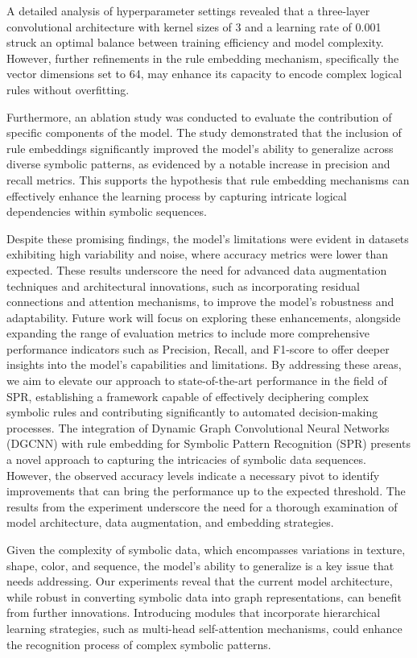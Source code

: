 \documentclass{article}
\begin{document}
A detailed analysis of hyperparameter settings revealed that a three-layer convolutional architecture with kernel sizes of 3 and a learning rate of 0.001 struck an optimal balance between training efficiency and model complexity. However, further refinements in the rule embedding mechanism, specifically the vector dimensions set to 64, may enhance its capacity to encode complex logical rules without overfitting.

Furthermore, an ablation study was conducted to evaluate the contribution of specific components of the model. The study demonstrated that the inclusion of rule embeddings significantly improved the model's ability to generalize across diverse symbolic patterns, as evidenced by a notable increase in precision and recall metrics. This supports the hypothesis that rule embedding mechanisms can effectively enhance the learning process by capturing intricate logical dependencies within symbolic sequences.

Despite these promising findings, the model's limitations were evident in datasets exhibiting high variability and noise, where accuracy metrics were lower than expected. These results underscore the need for advanced data augmentation techniques and architectural innovations, such as incorporating residual connections and attention mechanisms, to improve the model's robustness and adaptability. Future work will focus on exploring these enhancements, alongside expanding the range of evaluation metrics to include more comprehensive performance indicators such as Precision, Recall, and F1-score to offer deeper insights into the model's capabilities and limitations. By addressing these areas, we aim to elevate our approach to state-of-the-art performance in the field of SPR, establishing a framework capable of effectively deciphering complex symbolic rules and contributing significantly to automated decision-making processes.
The integration of Dynamic Graph Convolutional Neural Networks (DGCNN) with rule embedding for Symbolic Pattern Recognition (SPR) presents a novel approach to capturing the intricacies of symbolic data sequences. However, the observed accuracy levels indicate a necessary pivot to identify improvements that can bring the performance up to the expected threshold. The results from the experiment underscore the need for a thorough examination of model architecture, data augmentation, and embedding strategies. 

Given the complexity of symbolic data, which encompasses variations in texture, shape, color, and sequence, the model's ability to generalize is a key issue that needs addressing. Our experiments reveal that the current model architecture, while robust in converting symbolic data into graph representations, can benefit from further innovations. Introducing modules that incorporate hierarchical learning strategies, such as multi-head self-attention mechanisms, could enhance the recognition process of complex symbolic patterns.
\end{document}
